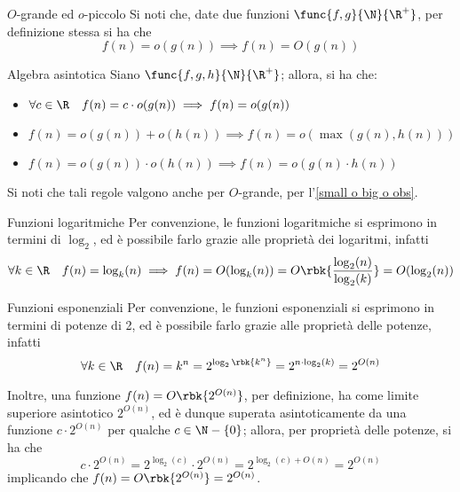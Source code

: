 \documentclass[a4paper, 12pt]{report}
\begin{document}
    \begin{framedobs}[label={small o big o obs}]{$O$-grande ed $o$-piccolo}
        Si noti che, date due funzioni $\func{f,g}{\N}{\R^+}$, per definizione stessa si ha che $$f(n) = o(g(n)) \implies f(n)= O(g(n))$$
    \end{framedobs}

    \begin{framedprop}[label={alg asintotica}]{Algebra asintotica}
        Siano $\func{f, g, h}{\N}{\R^+}$; allora, si ha che:
        
        \begin{itemize}
            \item $\forall c \in \R \quad f(n) = c \cdot o(g(n)) \implies f(n) = o(g(n))$
            \item $f(n) = o(g(n)) + o(h(n)) \implies f(n) = o(\max(g(n), h(n)))$
            \item $f(n) = o(g(n)) \cdot o(h(n)) \implies f(n) = o(g(n) \cdot h(n))$
        \end{itemize}

        Si noti che tali regole valgono anche per $O$-grande, per l'\cref{small o big o obs}.
    \end{framedprop}

    \begin{framedobs}[label={fn log}]{Funzioni logaritmiche}
        Per convenzione, le funzioni logaritmiche si esprimono in termini di $\log_2$, ed è possibile farlo grazie alle proprietà dei logaritmi, infatti $$\forall k \in \R \quad f(n) = \log_k(n) \implies f(n) = O(\log_k(n)) = O \rbk{\dfrac{\log_2(n)}{\log_2(k)}} = O(\log_2(n))$$
    \end{framedobs}

    \begin{framedobs}[label={fn exp}]{Funzioni esponenziali}
        Per convenzione, le funzioni esponenziali si esprimono in termini di potenze di 2, ed è possibile farlo grazie alle proprietà delle potenze, infatti $$\forall k \in \R \quad f(n) = k^n = 2^{\log_2\rbk{k^n}} = 2^{n \cdot \log_2 (k)} = 2^{O(n)}$$

        Inoltre, una funzione $f(n) = O\rbk{2^{O(n)}}$, per definizione, ha come limite superiore asintotico $2^{O(n)}$, ed è dunque superata asintoticamente da una funzione $c \cdot 2^{O(n)}$ per qualche $c \in \N - \{0\}$; allora, per proprietà delle potenze, si ha che $$c \cdot 2^{O(n)} = 2^{\log_2(c)} \cdot 2^{O(n)} = 2^{\log_2(c) + O(n)} = 2^{O(n)}$$ implicando che $f(n) = O\rbk{2^{O(n)}} = 2^{O(n)}$.
    \end{framedobs}
\end{document}
